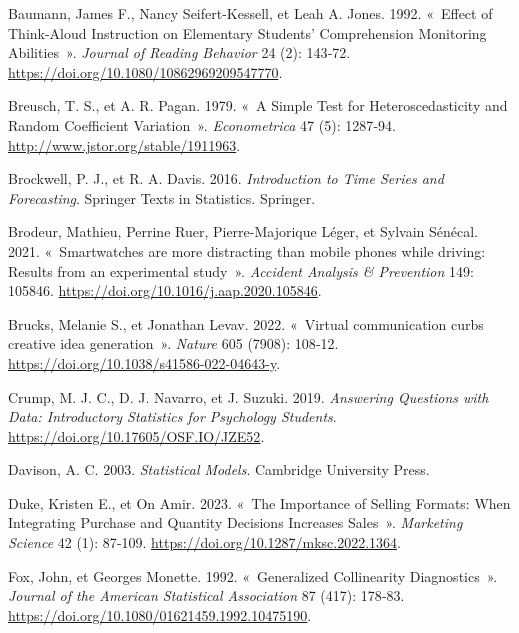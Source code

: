 \documentclass[
  11pt,
  letterpaper,
]{scrbook}
\newlength{\cslhangindent}
\newenvironment{CSLReferences}[2] %
 {\begin{list}{}{%
  \setlength{\itemindent}{0pt}
  \setlength{\leftmargin}{0pt}
  \setlength{\parsep}{0pt}
  \ifodd #1
   \setlength{\leftmargin}{\cslhangindent}
   \setlength{\itemindent}{-1\cslhangindent}
  \fi
  \setlength{\itemsep}{#2\baselineskip}}}
 {\end{list}}
\theoremstyle{definition}
\theoremstyle{definition}
\theoremstyle{plain}
\theoremstyle{plain}
\theoremstyle{remark}
\begin{document}
\label{refs}
\begin{CSLReferences}{1}{0}
Baumann, James F., Nancy Seifert-Kessell, et Leah A. Jones. 1992.
{«~Effect of Think-Aloud Instruction on Elementary Students'
Comprehension Monitoring Abilities~»}. \emph{Journal of Reading
Behavior} 24 (2): 143‑72.
\url{https://doi.org/10.1080/10862969209547770}.

Breusch, T. S., et A. R. Pagan. 1979. {«~A Simple Test for
Heteroscedasticity and Random Coefficient Variation~»}.
\emph{Econometrica} 47 (5): 1287‑94.
\url{http://www.jstor.org/stable/1911963}.

Brockwell, P. J., et R. A. Davis. 2016. \emph{Introduction to Time
Series and Forecasting}. Springer Texts in Statistics. Springer.

Brodeur, Mathieu, Perrine Ruer, Pierre-Majorique Léger, et Sylvain
Sénécal. 2021. {«~Smartwatches are more distracting than mobile phones
while driving: Results from an experimental study~»}. \emph{Accident
Analysis \& Prevention} 149: 105846.
\url{https://doi.org/10.1016/j.aap.2020.105846}.

Brucks, Melanie S., et Jonathan Levav. 2022. {«~Virtual communication
curbs creative idea generation~»}. \emph{Nature} 605 (7908): 108‑12.
\url{https://doi.org/10.1038/s41586-022-04643-y}.

Crump, M. J. C., D. J. Navarro, et J. Suzuki. 2019. \emph{Answering
Questions with Data: Introductory Statistics for Psychology Students}.
\url{https://doi.org/10.17605/OSF.IO/JZE52}.

Davison, A. C. 2003. \emph{Statistical Models}. Cambridge University
Press.

Duke, Kristen E., et On Amir. 2023. {«~The Importance of Selling
Formats: When Integrating Purchase and Quantity Decisions Increases
Sales~»}. \emph{Marketing Science} 42 (1): 87‑109.
\url{https://doi.org/10.1287/mksc.2022.1364}.

Fox, John, et Georges Monette. 1992. {«~Generalized Collinearity
Diagnostics~»}. \emph{Journal of the American Statistical Association}
87 (417): 178‑83. \url{https://doi.org/10.1080/01621459.1992.10475190}.


\end{CSLReferences}
\end{document}
